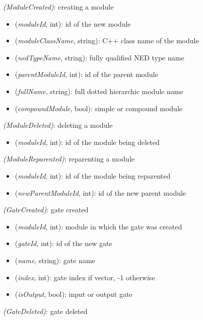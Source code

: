  \textit{(ModuleCreated)}: creating a module

\begin{itemize}
  \item {} (\textit{moduleId}, int): id of the new module
  \item {} (\textit{moduleClassName}, string): C++ class name of the module
  \item {} (\textit{nedTypeName}, string): fully qualified NED type name
  \item {} (\textit{parentModuleId}, int): id of the parent module
  \item {} (\textit{fullName}, string): full dotted hierarchic module name
  \item {} (\textit{compoundModule}, bool): simple or compound module
\end{itemize}

 \textit{(ModuleDeleted)}: deleting a module

\begin{itemize}
  \item {} (\textit{moduleId}, int): id of the module being deleted
\end{itemize}

 \textit{(ModuleReparented)}: reparenting a module

\begin{itemize}
  \item {} (\textit{moduleId}, int): id of the module being reparented
  \item {} (\textit{newParentModuleId}, int): id of the new parent module
\end{itemize}

 \textit{(GateCreated)}: gate created

\begin{itemize}
  \item {} (\textit{moduleId}, int): module in which the gate was created
  \item {} (\textit{gateId}, int): id of the new gate
  \item {} (\textit{name}, string): gate name
  \item {} (\textit{index}, int): gate index if vector, -1 otherwise
  \item {} (\textit{isOutput}, bool): input or output gate
\end{itemize}

 \textit{(GateDeleted)}: gate deleted

